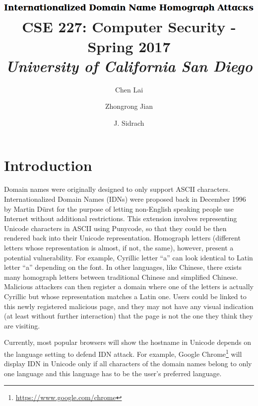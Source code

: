 \documentclass[letterpaper,twocolumn,10pt]{article}
\begin{document}
\date{}

\title{\Large
\includegraphics[height=\baselineskip]{title.png}
\\ \vspace{0.65mm} \large \normalfont
CSE 227: Computer Security - Spring 2017 \\ \textit{
University of California San Diego
}}

\author{
{\rm Chen Lai}\\
\and
{\rm Zhongrong Jian}\\
\and
{\rm J. Sidrach}\\
}

\maketitle


\section{Introduction}
Domain names were originally designed to only support ASCII characters.
Internationalized Domain Names (IDNs) were proposed back in December 1996 by Martin D\"{u}rst for the purpose of letting non-English speaking people use Internet without additional restrictions.
This extension involves representing Unicode characters in ASCII using Punycode, so that they could be then rendered back into their Unicode representation.
Homograph letters (different letters whose representation is almost, if not, the same), however, present a potential vulnerability.
For example, Cyrillic letter ``a'' can look identical to Latin letter ``a'' depending on the font.
In other languages, like Chinese, there exists many homograph letters between traditional Chinese and simplified Chinese.
Malicious attackers can then register a domain where one of the letters is actually Cyrillic but whose representation matches a Latin one.
Users could be linked to this newly registered malicious page, and they may not have any visual indication (at least without further interaction) that the page is not the one they think they are visiting.

Currently, most popular browsers will show the hostname in Unicode depends on the language setting to defend IDN attack.
For example, Google Chrome\footnote{\url{https://www.google.com/chrome}} will display IDN in Unicode only if all characters of the domain names belong to only one language and this language has to be the user's preferred language.
\end{document}
